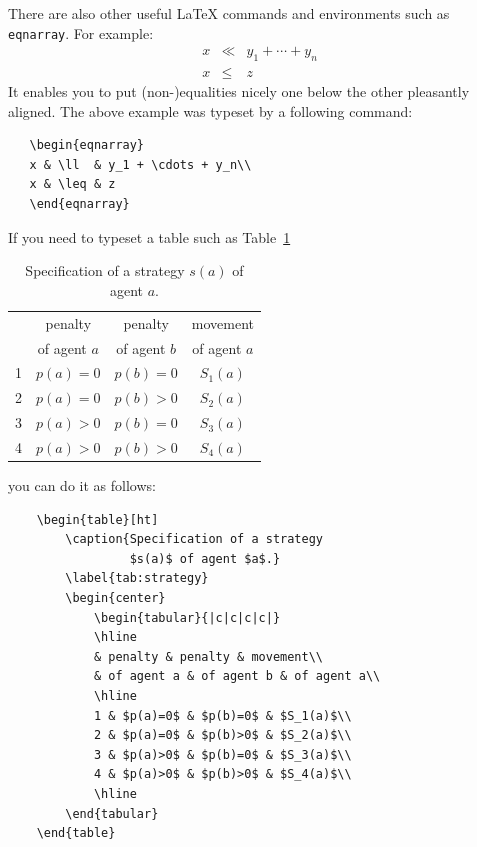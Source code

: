 \documentclass{iitsrc}
\begin{document}
There are also other useful \LaTeX{} commands and environments such as
\verb|eqnarray|. For example:
\begin{eqnarray}
x & \ll  & y_1 + \cdots + y_n\\
x & \leq & z
\end{eqnarray}
It enables you to put (non-)equalities nicely one below the other
pleasantly aligned. The above example was typeset by a following
command:
\begin{verbatim}
   \begin{eqnarray}
   x & \ll  & y_1 + \cdots + y_n\\
   x & \leq & z
   \end{eqnarray}
\end{verbatim}
%
If you need to typeset a table such as Table~\ref{tab:strategy}
\begin{table}[ht]
    \caption{Specification of a strategy  $s(a)$ of agent $a$.}
    \label{tab:strategy}
    \begin{center}
        \begin{tabular}{|c|c|c|c|}
        \hline
        & penalty & penalty & movement\\
        & of agent $a$ & of agent $b$ & of agent $a$\\
        \hline
        1 & $p(a)=0$ & $p(b)=0$ & $S_1(a)$\\
        2 & $p(a)=0$ & $p(b)>0$ & $S_2(a)$\\
        3 & $p(a)>0$ & $p(b)=0$ & $S_3(a)$\\
        4 & $p(a)>0$ & $p(b)>0$ & $S_4(a)$\\
        \hline
    \end{tabular}
\end{center}
\end{table}
you can do it as follows:
\begin{verbatim}
    \begin{table}[ht]
        \caption{Specification of a strategy
                 $s(a)$ of agent $a$.}
        \label{tab:strategy}
        \begin{center}
            \begin{tabular}{|c|c|c|c|}
            \hline
            & penalty & penalty & movement\\
            & of agent a & of agent b & of agent a\\
            \hline
            1 & $p(a)=0$ & $p(b)=0$ & $S_1(a)$\\
            2 & $p(a)=0$ & $p(b)>0$ & $S_2(a)$\\
            3 & $p(a)>0$ & $p(b)=0$ & $S_3(a)$\\
            4 & $p(a)>0$ & $p(b)>0$ & $S_4(a)$\\
            \hline
        \end{tabular}
    \end{table}
\end{verbatim}
\end{document}
